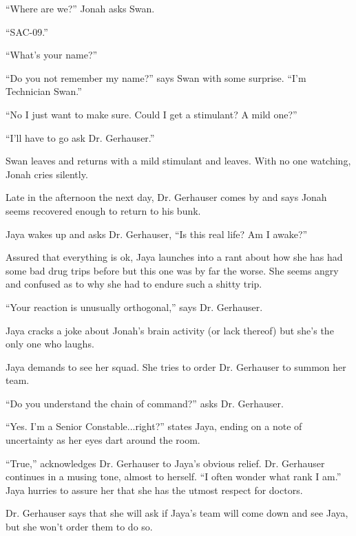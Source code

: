 ``Where are we?'' Jonah asks Swan.

``SAC-09.''

``What's your name?''

``Do you not remember my name?'' says Swan with some surprise. ``I'm Technician Swan.''

``No I just want to make sure. Could I get a stimulant?  A mild one?''

``I'll have to go ask Dr. Gerhauser.''



Swan leaves and returns with a mild stimulant and leaves.  With no one watching, Jonah cries silently.



Late in the afternoon the next day, Dr. Gerhauser comes by and says Jonah seems recovered enough to return to his bunk.



Jaya wakes up and asks Dr. Gerhauser, ``Is this real life?  Am I awake?''

Assured that everything is ok, Jaya launches into a rant about how she has had some bad drug trips before but this one was by far the worse.  She seems angry and confused as to why she had to endure such a shitty trip.  

``Your reaction is unusually orthogonal,'' says Dr. Gerhauser.

Jaya cracks a joke about Jonah's brain activity (or lack thereof) but she's the only one who laughs.



Jaya demands to see her squad.  She tries to order Dr. Gerhauser to summon her team.



``Do you understand the chain of command?'' asks Dr. Gerhauser.

``Yes.  I'm a Senior Constable...right?'' states Jaya, ending on a note of uncertainty as her eyes dart around the room.

``True,'' acknowledges Dr. Gerhauser to Jaya's obvious relief. Dr. Gerhauser continues in a musing tone, almost to herself.  ``I often wonder what rank I am.''  Jaya hurries to assure her that she has the utmost respect for doctors.  



Dr. Gerhauser says that she will ask if Jaya's team will come down and see Jaya, but she won't order them to do so.




